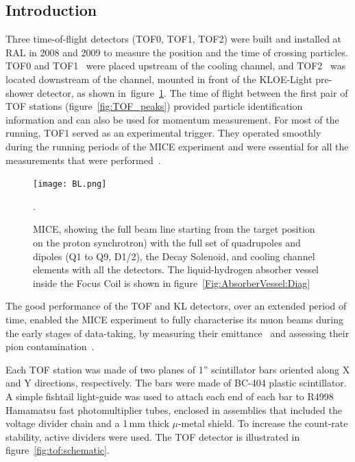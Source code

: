 \subsection{Introduction}
\label{SubSect:TOF_Intro}

Three time-of-flight detectors (TOF0, TOF1, TOF2) were built and
installed at RAL in 2008 and 2009 to measure the position and the time
of crossing particles.  TOF0 and
TOF1~\cite{NOTE145}\cite{NOTE241}\cite{2010NIMPA.615...14B} were
placed upstream of the cooling channel, and TOF2~\cite{NOTE286} was
located downstream of the channel, mounted in front of the KLOE-Light pre-shower detector, as shown
in~figure~\ref{fig:BL}.  The time of flight between the first pair of TOF stations (figure~\ref{fig:TOF_peaks})
provided particle identification information and can also be used for
momentum measurement. For most of the running, TOF1 served as an experimental trigger.
They operated smoothly during the 
running periods of the MICE experiment and were essential for all the
measurements that were performed~\cite{Rajaram:2015bra}\cite{2015ehep.confE.521B}.

\begin{figure}[!ht]
  \begin{center}
    \texttt{[image: BL.png]}
    \caption{MICE, showing the full beam line starting from the target position on the proton synchrotron) with the full set of quadrupoles and dipoles (Q1 to Q9, D1/2), the Decay Solenoid, and cooling channel elements with all the detectors. The liquid-hydrogen absorber vessel inside the Focus Coil is shown in figure~\ref{Fig:AbsorberVessel:Diag}}.
    \label{fig:BL}
  \end{center}
\end{figure}

The good performance of the TOF and KL detectors, over an extended period of time,
enabled the MICE experiment to fully characterise its muon beams during
the early stages of data-taking, by measuring their emittance~\cite{2013arXiv1306.1509T} and assessing their pion contamination~\cite{2016JInst..11P3001A}.

Each TOF station was made of two planes of 1'' scintillator bars oriented along X and Y directions, respectively.
The bars were made of BC-404 plastic scintillator. A simple fishtail light-guide was used to attach each end of each bar to R4998 Hamamatsu fast photomultiplier tubes,
enclosed in assemblies that included the voltage divider chain and a 1\,mm thick $\mu$-metal shield. To increase the count-rate stability, active
dividers were used. The TOF detector is illustrated in figure~\ref{fig:tof:schematic}.

